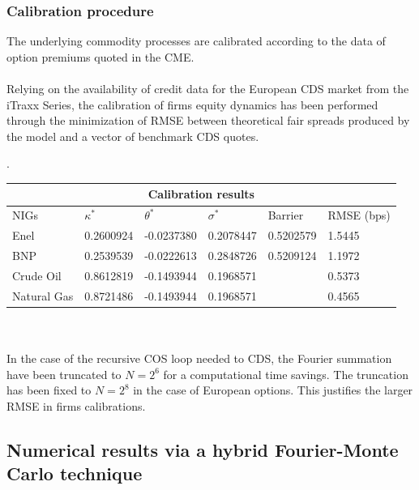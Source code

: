 \documentclass{beamer}
\begin{document}
\begin{frame}
\frametitle{Calibration procedure}
\footnotesize{
	The underlying commodity processes are calibrated according to the data of option premiums quoted in the CME. \\~\\

	Relying on the availability of credit data for the European CDS market from the iTraxx Series, the calibration of firms equity dynamics has been performed through the minimization of RMSE between theoretical fair spreads produced by the model and a vector of benchmark CDS quotes.

.
\begin{tabular}{ |p{1.9cm}||p{1.6cm}|p{1.8cm}|p{1.6cm}|p{1.6cm}|p{1.2 cm}| }
 \hline
 \multicolumn{6}{|c|}{\textbf{Calibration results}} \\
 \hline
NIGs& $\kappa^{*}$ & $\theta^{*}$ & $\sigma^{*}$ & Barrier &RMSE  (bps)\\
 \hline
 Enel  & 0.2600924    &-0.0237380 & 0.2078447 &0.5202579 &1.5445\\
 BNP  & 0.2539539  & -0.0222613  &0.2848726 &0.5209124 &1.1972\\
 Crude Oil &0.8612819 &-0.1493944 & 0.1968571 & &0.5373\\
 Natural Gas    &0.8721486 & -0.1493944 &0.1968571 &  &0.4565\\
   
 \hline
\end{tabular} \\~\\

	In the case of the recursive COS loop needed to CDS, the Fourier summation have been truncated to $N= 2^6 $ for a computational time savings. The truncation has been fixed to $N= 2^8 $ in the case of European options. This justifies the larger RMSE in firms calibrations. 
}
\end{frame}

\subsection{Numerical results via a hybrid Fourier-Monte Carlo technique}
\end{document}
